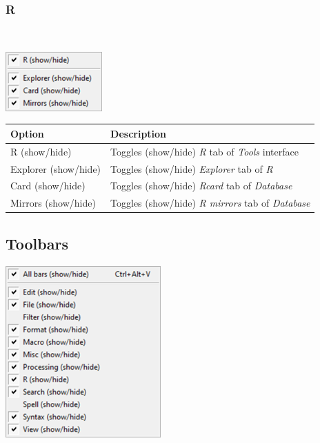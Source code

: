 \hypertarget{menu_view_tools_resources_r}{}
\subsubsection{R}\\

\includegraphics[scale=0.50]{./res/menu_view_tools_resources_r.png}\\

\begin{scriptsize}\begin{tabularx}{\textwidth}{>{\hsize=0.3\hsize}X>{\hsize=0.7\hsize}X}\\
    \hline
    \textbf{Option} & \textbf{Description} \\
    \hline
    R (show/hide) & Toggles (show/hide) \textit{R} tab of \textit{Tools} interface \\
    Explorer (show/hide) & Toggles (show/hide) \textit{Explorer} tab of \textit{R} \\
    Card (show/hide) & Toggles (show/hide) \textit{Rcard} tab of \textit{Database} \\
    Mirrors (show/hide) & Toggles (show/hide) \textit{R mirrors} tab of \textit{Database} \\
    \hline
  \end{tabularx}\end{scriptsize}


\hypertarget{menu_view_toolbars}{}
\subsection{Toolbars}

\includegraphics[scale=0.50]{./res/menu_view_toolsbar.png}\\


